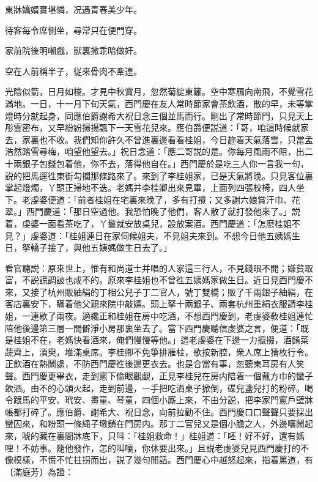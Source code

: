 \begin{myquote}
東牀嬌婿實堪憐，况遇青春美少年。

待客每令席側坐，尋常只在便門穿。

家前院後明嘲戲，獃裏撒乖暗做奸。

空在人前稱半子，従來骨肉不牽連。
\end{myquote}

光陰似箭，日月如梭。才見中秋賞月，忽然菊綻東籬。空中寒鴈向南飛，不覺雪花滿地。一日，十一月下旬天氣，西門慶在友人常時節家會茶飲酒，散的早，未等掌燈時分就起身，同應伯爵謝希大祝日念三個並馬而行。剛出了常時節門，只見天上彤雲密布，又早紛紛揚揚飄下一天雪花兒來。應伯爵便説道：「哥，咱這時候就家去，家裏也不收。我們知你許久不曾進裏邊看看桂姐，今日趂着天氣落雪，只當孟浩然踏雪尋梅，咱望他望去。」祝日念道：「應二哥説的是。你每月風雨不阻，出二十兩銀子包錢包着他，你不去，落得他自在。」西門慶於是吃三人你一言我一句，説的把馬逕徃東街勾攔那條路來了。來到了李桂姐家，已是天氣將晚。只見客位裏掌起燈燭，丫頭正掃地不迭。老媽并李桂卿出來見畢，上面列四張校椅，四人坐下。老虔婆便道：「前者桂姐在宅裏來晚了，多有打攪；又多謝六娘賞汗巾、花翠。」西門慶道：「那日空過他。我恐怕晚了他們，客人散了就打發他來了。」説着，虔婆一面看茶吃了，丫鬟就安放桌兒，設放案酒。西門慶道：「怎麽桂姐不見？」虔婆道：「桂姐連日在家伺候姐夫，不見姐夫來到。不想今日他五姨媽生日，拏轎子接了，與他五姨媽做生日去了。」

看官聽説：原來世上，惟有和尚道士并唱的人家這三行人，不見錢眼不開；嫌貧取富，不説謊調詖也成不的。原來李桂姐也不曾徃五姨媽家做生日。近日見西門慶不來，又接了杭州販紬絹的丁相公兒子丁二官人，號丁雙橋；販了千兩銀子紬絹，在客店裏安下，瞞着他父親來院中敲嫖。頭上拏十兩銀子、兩套杭州重絹衣服請李桂姐，一連歇了兩夜。適纔正和桂姐在房中吃酒，不想西門慶到，老虔婆敎桂姐連忙陪他後邊第三層一間僻淨小房那裏坐去了。當下西門慶聽信虔婆之言，便道：「既是桂姐不在，老媽快看酒來，俺們慢慢等他。」這老虔婆在下邊一力攛掇，酒餚菜蔬齊上，湏臾，堆滿桌席。李桂卿不免箏排雁柱，歌按新腔，衆人席上猜枚行令。正飲酒在熱鬧處，不防西門慶徃後邊更衣去。也是合當有事，忽聽東耳房有人笑聲。西門慶更畢衣，走到窻下偸眼觀覷，正見李桂兒在房内陪着一個戴方巾的蠻子飲酒。由不的心頭火起，走到前邊，一手把吃酒桌子掀倒，碟兒盞兒打的粉碎。喝令跟馬的平安、玳安、畫童、琴童，四個小廝上來，不由分説，把李家門窻戶壁牀帳都打碎了。應伯爵、謝希大、祝日念，向前拉勸不住。西門慶口口聲聲只要採出蠻囚來，和粉頭一條䋲子墩鎖在門房内。那丁二官兒又是個小膽之人，外邊嚷鬧起來，唬的藏在裏間牀底下，只呌：「桂姐救命！」桂姐道：「呸！好不好，還有媽哩！不妨事。隨他發作，怎的叫嚷，你休要出來。」且説老虔婆兒見西門慶打的不像模樣，不慌不忙拄拐而出，説了幾句閒話。西門慶心中越怒起來，指着罵道，有〔滿庭芳〕為證：

